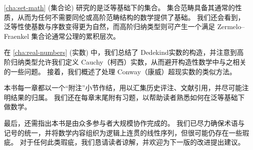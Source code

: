 \cref{cha:set-math} (集合论) 研究的是泛等基础下的集合。
集合范畴具备其通常的性质，从而为任何不需要同伦或高阶范畴结构的数学提供了基础。
我们还会看到，泛等性使基数与序数变得更为自然，而高阶归纳类型则可产生一个满足 Zermelo--Fraenkel 集合论通常公理的累积层次。

在 \cref{cha:real-numbers} (实数) 中，我们总结了 Dedekind实数的构造，并注意到高阶归纳类型允许我们定义 Cauchy（柯西）实数，从而避开构造性数学中与之相关的一些问题。
接着，我们概述了处理 Conway（康威）超现实数的类似方法。

本书每一章都以一个“附注”小节作结，用以汇集历史评注、文献引用，并尽可能注明结果的归属。
我们还在每章末尾附有习题，以帮助读者熟悉如何在泛等基础下做数学。

最后，还需指出本书是由众多参与者大规模协作完成的。
我们已尽力确保术语与记号的统一，并将数学内容组织为逻辑上连贯的线性序列，但很可能仍存在一些瑕疵。
对于任何此类瑕疵，我们恳请读者谅解，并欢迎为下一版的改进提出建议。

